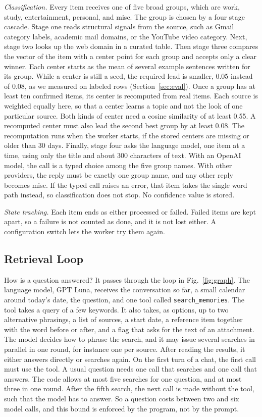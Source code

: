\documentclass[conference]{IEEEtran}
\newcommand{\llmname}{GPT\nobreakdash-6 Luna}
\begin{document}
\textit{Classification.} Every item receives one of five broad groups, which are work, study, entertainment, personal, and misc. The group is chosen by a four stage cascade. Stage one reads structural signals from the source, such as Gmail category labels, academic mail domains, or the YouTube video category. Next, stage two looks up the web domain in a curated table. Then stage three compares the vector of the item with a center point for each group and accepts only a clear winner. Each center starts as the mean of several example sentences written for its group. While a center is still a seed, the required lead is smaller, 0.05 instead of 0.08, as we measured on labeled rows (Section~\ref{sec:eval}). Once a group has at least ten confirmed items, its center is recomputed from real items. Each source is weighted equally here, so that a center learns a topic and not the look of one particular source. Both kinds of center need a cosine similarity of at least 0.55. A recomputed center must also lead the second best group by at least 0.08. The recomputation runs when the worker starts, if the stored centers are missing or older than 30 days. Finally, stage four asks the language model, one item at a time, using only the title and about 300 characters of text. With an OpenAI model, the call is a typed choice among the five group names. With other providers, the reply must be exactly one group name, and any other reply becomes misc. If the typed call raises an error, that item takes the single word path instead, so classification does not stop. No confidence value is stored.

\textit{State tracking.} Each item ends as either processed or failed. Failed items are kept apart, so a failure is not counted as done, and it is not lost either. A configuration switch lets the worker try them again.

\subsection{Retrieval Loop}
How is a question answered? It passes through the loop in Fig.~\ref{fig:graph}. The language model, \llmname{}, receives the conversation so far, a small calendar around today's date, the question, and one tool called \texttt{search\_memories}. The tool takes a query of a few keywords. It also takes, as options, up to two alternative phrasings, a list of sources, a start date, a reference item together with the word before or after, and a flag that asks for the text of an attachment. The model decides how to phrase the search, and it may issue several searches in parallel in one round, for instance one per source. After reading the results, it either answers directly or searches again. On the first turn of a chat, the first call must use the tool. A usual question needs one call that searches and one call that answers. The code allows at most five searches for one question, and at most three in one round. After the fifth search, the next call is made without the tool, such that the model has to answer. So a question costs between two and six model calls, and this bound is enforced by the program, not by the prompt.
\end{document}
